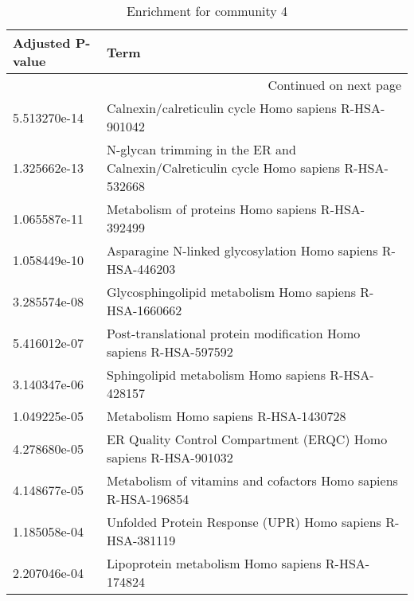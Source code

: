 \begin{longtable}{p{2.4cm}p{14.5cm}}
\caption{Enrichment for community 4}\\
\toprule
Adjusted \newline P-value &                                                                                                  Term \\
\midrule
\endhead
\midrule
\multicolumn{2}{r}{{Continued on next page}} \\
\midrule
\endfoot

\bottomrule
\endlastfoot
             5.513270e-14 &                                                 Calnexin/calreticulin cycle Homo sapiens R-HSA-901042 \\
             1.325662e-13 &                 N-glycan trimming in the ER and Calnexin/Calreticulin cycle Homo sapiens R-HSA-532668 \\
             1.065587e-11 &                                                      Metabolism of proteins Homo sapiens R-HSA-392499 \\
             1.058449e-10 &                                           Asparagine N-linked glycosylation Homo sapiens R-HSA-446203 \\
             3.285574e-08 &                                               Glycosphingolipid metabolism Homo sapiens R-HSA-1660662 \\
             5.416012e-07 &                                     Post-translational protein modification Homo sapiens R-HSA-597592 \\
             3.140347e-06 &                                                     Sphingolipid metabolism Homo sapiens R-HSA-428157 \\
             1.049225e-05 &                                                                 Metabolism Homo sapiens R-HSA-1430728 \\
             4.278680e-05 &                                       ER Quality Control Compartment (ERQC) Homo sapiens R-HSA-901032 \\
             4.148677e-05 &                                        Metabolism of vitamins and cofactors Homo sapiens R-HSA-196854 \\
             1.185058e-04 &                                             Unfolded Protein Response (UPR) Homo sapiens R-HSA-381119 \\
             2.207046e-04 &                                                      Lipoprotein metabolism Homo sapiens R-HSA-174824 \\

\end{longtable}
